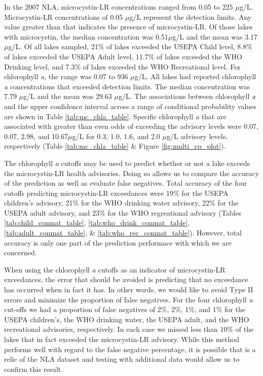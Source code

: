 \documentclass[10pt,a4paper,twocolumn]{article}
\begin{document}
In the 2007 NLA, microcystin-LR concentrations ranged from 0.05 to 225
\(\mu\)g/L. Microcystin-LR concentrations of 0.05 \(\mu\)g/L represent
the detection limits. Any value greater than that indicates the presence
of microcystin-LR. Of those lakes with microcystin, the median
concentration was 0.51\(\mu\)g/L and the mean was 3.17\(\mu\)g/L. Of all
lakes sampled, 21\% of lakes exceeded the USEPA Child level, 8.8\% of
lakes exceeded the USEPA Adult level, 11.7\% of lakes exceeded the WHO
Drinking level, and 7.3\% of lakes exceeded the WHO Recreational level.
For chlorophyll \emph{a}, the range was 0.07 to 936 \(\mu\)g/L. All
lakes had reported chlorophyll \emph{a} concentrations that exceeded
detection limits. The median concentration was 7.79 \(\mu\)g/L and the
mean was 29.63 \(\mu\)g/L. The associations between chlorophyll \emph{a}
and the upper confidence interval across a range of conditional
probability values are shown in Table \ref{tab:mc_chla_table}. Specific
chlorophyll \emph{a} that are associated with greater than even odds of
exceeding the advisory levels were 0.07, 0.07, 2.98, and 10.67\(\mu\)g/L
for 0.3, 1.0, 1.6, and 2.0 \(\mu\)g/L advisory levels, respectively
(Table \ref{tab:mc_chla_table} \& Figure \ref{fig:multi_cp_plot}).

The chlorophyll \emph{a} cutoffs may be used to predict whether or not a
lake exceeds the microcystin-LR health advisories. Doing so allows us to
compare the accuracy of the prediction as well as evaluate false
negatives. Total accuracy of the four cutoffs predicting microcystin-LR
exceedances were 19\% for the USEPA children's advisory, 21\% for the
WHO drinking water advisory, 22\% for the USEPA adult advisory, and 23\%
for the WHO regreational advisory (Tables \ref{tab:child_conmat_table},
\ref{tab:who_drink_conmat_table}, \ref{tab:adult_conmat_table}, \&
\ref{tab:who_rec_conmat_table}). However, total accuracy is only one
part of the prediction performace with which we are concerned.

When using the chlorophyll \emph{a} cutoffs as an indicator of
microcystin-LR exceedances, the error that should be avoided is
predicting that no exceedance has occurred when in fact it has. In other
words, we would like to avoid Type II errors and minimize the proportion
of false negatives. For the four chlorophyll \emph{a} cut-offs we had a
proportion of false negatives of 2\%, 2\%, 1\%, and 1\% for the USEPA
children's, the WHO drinking water, the USEPA adult, and the WHO
recreational advisories, respectively. In each case we missed less than
10\% of the lakes that in fact exceeded the microcystin-LR advisory.
While this method performs well with regard to the false negative
percentage, it is possible that is a relic of the NLA dataset and
testing with additional data would allow us to confirm this result.
\end{document}
